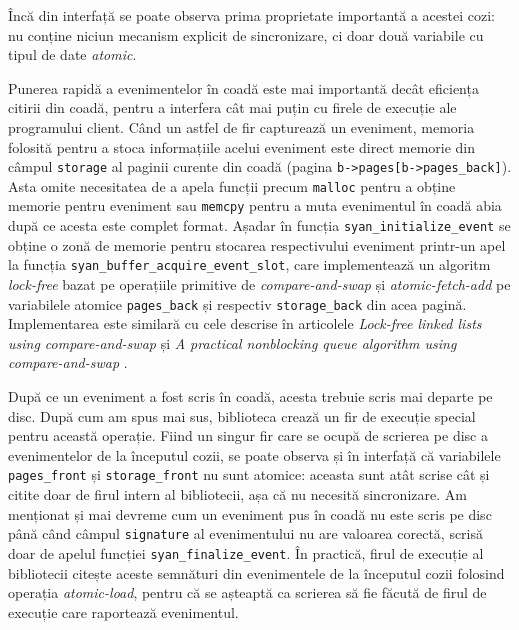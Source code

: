 Încă din interfață se poate observa prima proprietate importantă a
acestei cozi: nu conține niciun mecanism explicit de sincronizare, ci
doar două variabile cu tipul de date \textit{atomic}.

Punerea rapidă a evenimentelor în coadă este mai importantă decât
eficiența citirii din coadă, pentru a interfera cât mai puțin cu firele
de execuție ale programului client. Când un astfel de fir capturează un
eveniment, memoria folosită pentru a stoca informațiile acelui eveniment
este direct memorie din câmpul \lstinline{storage} al paginii curente
din coadă (pagina \lstinline{b->pages[b->pages_back]}). Asta omite
necesitatea de a apela funcții precum \lstinline{malloc} pentru a obține
memorie pentru eveniment sau \lstinline{memcpy} pentru a muta
evenimentul în coadă abia după ce acesta este complet format. Așadar în
funcția \lstinline{syan_initialize_event} se obține o zonă de memorie
pentru stocarea respectivului eveniment printr-un apel la funcția
\lstinline{syan_buffer_acquire_event_slot}, care implementează un
algoritm \textit{lock-free} bazat pe operațiile primitive de
\textit{compare-and-swap} și \textit{atomic-fetch-add} pe variabilele
atomice \lstinline{pages_back} și respectiv \lstinline{storage_back} din
acea pagină. Implementarea este similară cu cele descrise în articolele
\textit{Lock-free linked lists using compare-and-swap}
\cite{LinkedListsCAS} și
\textit{A practical nonblocking queue algorithm using compare-and-swap}
\cite{QueueCAS}.

După ce un eveniment a fost scris în coadă, acesta trebuie scris mai
departe pe disc. După cum am spus mai sus, biblioteca crează un fir de
execuție special pentru această operație. Fiind un singur fir care se
ocupă de scrierea pe disc a evenimentelor de la începutul cozii, se
poate observa și în interfață că variabilele \lstinline{pages_front} și
\lstinline{storage_front} nu sunt atomice: aceasta sunt atât scrise cât
și citite doar de firul intern al bibliotecii, așa că nu necesită
sincronizare. Am menționat și mai devreme cum un eveniment pus în coadă
nu este scris pe disc până când câmpul \lstinline{signature} al
evenimentului nu are valoarea corectă, scrisă doar de apelul funcției
\lstinline{syan_finalize_event}. În practică, firul de execuție al
bibliotecii citește aceste semnături din evenimentele de la începutul
cozii folosind operația \textit{atomic-load}, pentru că se așteaptă ca
scrierea să fie făcută de firul de execuție care raportează evenimentul.

